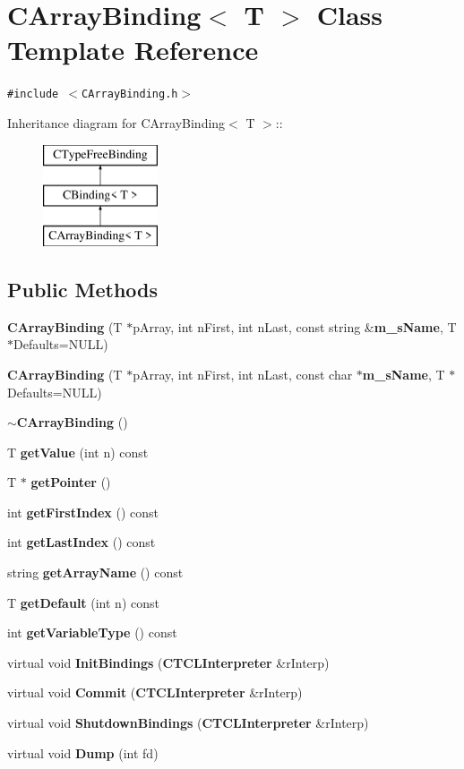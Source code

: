 \section{CArray\-Binding$<$ T $>$  Class Template Reference}
\label{classCArrayBinding}
{\tt \#include $<$CArray\-Binding.h$>$}

Inheritance diagram for CArray\-Binding$<$ T $>$::\begin{figure}[H]
\begin{center}
\leavevmode
\includegraphics[height=3cm]{classCArrayBinding}
\end{center}
\end{figure}
\subsection*{Public Methods}
\begin{CompactItemize}
\item 
{\bf CArray\-Binding} (T $\ast$p\-Array, int n\-First, int n\-Last, const string \&{\bf m\_\-s\-Name}, T $\ast$Defaults=NULL)
\item 
{\bf CArray\-Binding} (T $\ast$p\-Array, int n\-First, int n\-Last, const char $\ast${\bf m\_\-s\-Name}, T $\ast$Defaults=NULL)
\item 
{\bf $\sim$CArray\-Binding} ()
\item 
T {\bf get\-Value} (int n) const
\item 
T $\ast$ {\bf get\-Pointer} ()
\item 
int {\bf get\-First\-Index} () const
\item 
int {\bf get\-Last\-Index} () const
\item 
string {\bf get\-Array\-Name} () const
\item 
T {\bf get\-Default} (int n) const
\item 
int {\bf get\-Variable\-Type} () const
\item 
virtual void {\bf Init\-Bindings} ({\bf CTCLInterpreter} \&r\-Interp)
\item 
virtual void {\bf Commit} ({\bf CTCLInterpreter} \&r\-Interp)
\item 
virtual void {\bf Shutdown\-Bindings} ({\bf CTCLInterpreter} \&r\-Interp)
\item 
virtual void {\bf Dump} (int fd)
\end{CompactItemize}

